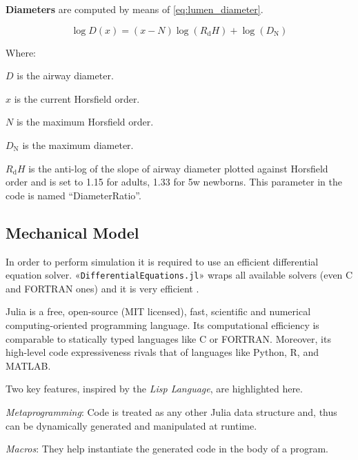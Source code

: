 
\textbf{Diameters} are computed by means of \cref{eq:lumen_diameter}.

\begin{equation}
  \log D(x) = (x - N)\log(R_{\text{d}} H) + \log(D_{\text{N}})
  \label{eq:lumen_diameter}
\end{equation}

Where:
\begin{description}
\item $D$ is the airway diameter.
\item $x$ is the current Horsfield order.
\item $N$ is the maximum Horsfield order.
\item $D_{\text{N}}$ is the maximum diameter.
\item $R_{\text{d}} H$ is the anti-log of the slope of airway diameter
  plotted against Horsfield order and is set to 1.15 for adults, 1.33
  for 5w newborns\cite[][Tab. 2]{horsfield1987}.  This parameter in
  the code is named ``DiameterRatio''.
\end{description}
  
\subsection{Mechanical Model}
\label{subsec:simulator_development}

In order to perform simulation it is required to use an efficient
differential equation solver.  «\texttt{DifferentialEquations.jl}»
wraps all available solvers (even C and FORTRAN ones) and it is very
efficient \cite{diffeqdocs2024,rackauckas2017}.

Julia is a free, open-source (MIT licensed), fast, scientific and
numerical computing-oriented programming language.  Its computational
efficiency is comparable to statically typed languages like C
or FORTRAN.  Moreover, its high-level code expressiveness rivals that of
languages like Python, R, and MATLAB\cite{juliadocs2024}.

Two key features, inspired by the \emph{Lisp Language}, are
highlighted here.

\begin{description}
\item \emph{Metaprogramming}: Code is treated as any other Julia data
  structure and, thus can be dynamically generated and manipulated at
  runtime.
\item \emph{Macros}: They help instantiate the generated code in the
  body of a program.
\end{description}

